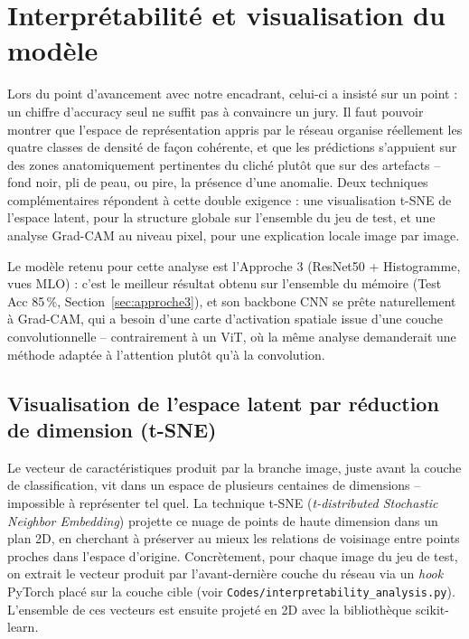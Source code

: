 \documentclass[12pt,a4paper]{report}
\begin{document}
\chapter{Interprétabilité et visualisation du modèle}
\label{sec:interpretabilite}

Lors du point d'avancement avec notre encadrant, celui-ci a insisté sur un
point : un chiffre d'accuracy seul ne suffit pas à convaincre un jury. Il
faut pouvoir montrer que l'espace de représentation appris par le réseau
organise réellement les quatre classes de densité de façon cohérente, et
que les prédictions s'appuient sur des zones anatomiquement pertinentes du
cliché plutôt que sur des artefacts -- fond noir, pli de peau, ou pire, la
présence d'une anomalie. Deux techniques complémentaires répondent à cette
double exigence : une visualisation t-SNE de l'espace latent, pour la
structure globale sur l'ensemble du jeu de test, et une analyse Grad-CAM au
niveau pixel, pour une explication locale image par image.

Le modèle retenu pour cette analyse est l'Approche 3 (ResNet50 +
Histogramme, vues MLO) : c'est le meilleur résultat obtenu sur l'ensemble
du mémoire (Test Acc 85\,\%, Section~\ref{sec:approche3}), et son backbone
CNN se prête naturellement à Grad-CAM, qui a besoin d'une carte
d'activation spatiale issue d'une couche convolutionnelle -- contrairement
à un ViT, où la même analyse demanderait une méthode adaptée à
l'attention plutôt qu'à la convolution.

\section{Visualisation de l'espace latent par réduction de dimension (t-SNE)}
\label{sec:tsne}

Le vecteur de caractéristiques produit par la branche image, juste avant la
couche de classification, vit dans un espace de plusieurs centaines de
dimensions -- impossible à représenter tel quel. La technique t-SNE
(\emph{t-distributed Stochastic Neighbor Embedding}) \cite{ref_tsne}
projette ce nuage de points de haute dimension dans un plan 2D, en cherchant
à préserver au mieux les relations de voisinage entre points proches dans
l'espace d'origine. Concrètement, pour chaque image du jeu de test, on
extrait le vecteur produit par l'avant-dernière couche du réseau via un
\emph{hook} PyTorch placé sur la couche cible (voir
\texttt{Codes/interpretability\_analysis.py}). L'ensemble de ces vecteurs
est ensuite projeté en 2D avec la bibliothèque scikit-learn.
\end{document}
